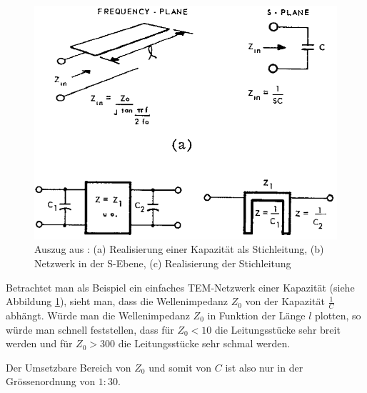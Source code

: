 \begin{figure}[h!]
    \centering
    \includegraphics[width=\imagewidth]{images/bereich}
    \caption{Auszug aus \cite{ref:wenzel}: (a) Realisierung einer Kapazit\"at als Stichleitung, (b) Netzwerk in der S-Ebene, (c) Realisierung der Stichleitung}
    \label{fig:bereich}
\end{figure}

Betrachtet  man als Beispiel  ein  einfaches  TEM-Netzwerk  einer  Kapazit\"at
(siehe Abbildung \ref{fig:bereich}), sieht man, dass die  Wellenimpedanz $Z_0$
von  der Kapazit\"at $\frac{1}{C}$ abh\"angt. W\"urde man  die  Wellenimpedanz
$Z_0$ in Funktion der L\"ange $l$ plotten, so w\"urde man schnell feststellen,
dass f\"ur $Z_0<10$ die Leitungsst\"ucke sehr breit werden und  f\"ur  $Z_0  >
300$ die Leitungsst\"ucke sehr schmal werden.

Der Umsetzbare Bereich von $Z_0$ und  somit  von  $C$  ist  also  nur  in  der
Gr\"ossenordnung von $1:30$.

